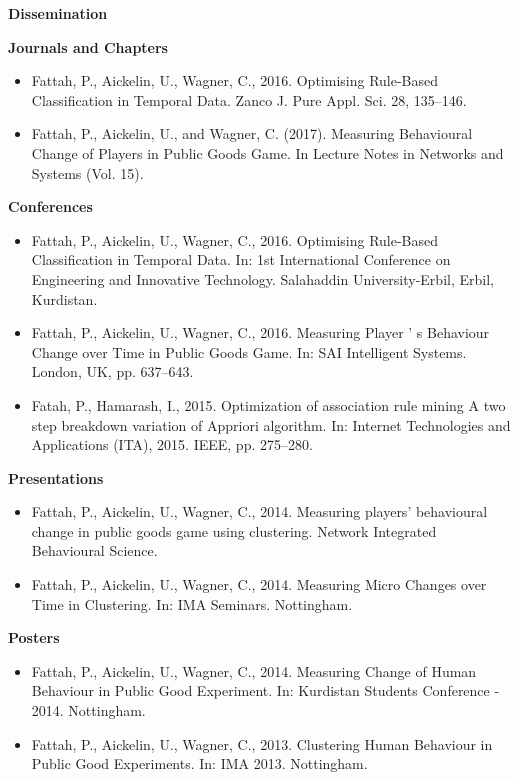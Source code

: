 
\begin{center}
	\textbf{Dissemination}
\end{center}



\textbf{Journals and Chapters}

\begin{itemize}
\item Fattah, P., Aickelin, U., Wagner, C., 2016. Optimising Rule-Based Classification in Temporal Data. Zanco J. Pure Appl. Sci. 28, 135--146.

\item Fattah, P., Aickelin, U., and Wagner, C. (2017). Measuring Behavioural Change of Players in Public Goods Game. In Lecture Notes in Networks and Systems (Vol. 15).

\end{itemize}




\textbf{Conferences}
\begin{itemize}
\item Fattah, P., Aickelin, U., Wagner, C., 2016. Optimising Rule-Based Classification in Temporal Data. In: 1st International Conference on Engineering and Innovative Technology. Salahaddin University-Erbil, Erbil, Kurdistan.

\item Fattah, P., Aickelin, U., Wagner, C., 2016. Measuring Player ' s Behaviour Change over Time in Public Goods Game. In: SAI Intelligent Systems. London, UK, pp. 637--643.

\item Fatah, P., Hamarash, I., 2015. Optimization of association rule mining A two step breakdown variation of Appriori algorithm. In: Internet Technologies and Applications (ITA), 2015. IEEE, pp. 275--280.
\end{itemize}

\textbf{Presentations}

\begin{itemize}
\item Fattah, P., Aickelin, U., Wagner, C., 2014. Measuring players' behavioural change in public goods game using clustering. Network Integrated Behavioural Science.

\item Fattah, P., Aickelin, U., Wagner, C., 2014. Measuring Micro Changes over Time in Clustering. In: IMA Seminars. Nottingham.
\end{itemize}

\textbf{Posters}

\begin{itemize}
\item Fattah, P., Aickelin, U., Wagner, C., 2014. Measuring Change of Human Behaviour in Public Good Experiment. In: Kurdistan Students Conference - 2014. Nottingham.

\item Fattah, P., Aickelin, U., Wagner, C., 2013. Clustering Human Behaviour in Public Good Experiments. In: IMA 2013. Nottingham.
\end{itemize}
